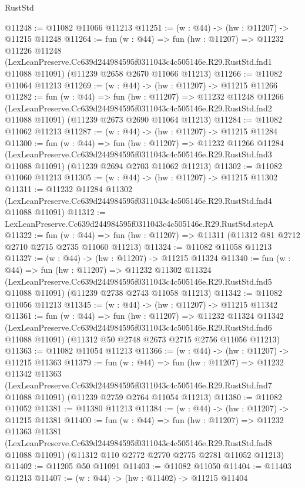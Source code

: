 \begin{lexlean}{RustStd}
\begin{coremodule}
@11248 := @11082 @11066 @11213
@11251 := (w : @44) -> (hw : @11207) -> @11215 @11248
@11264 := fun (w : @44) =>
  fun (hw : @11207) =>
  @11232
    @11226
    @11248
    (LexLeanPreserve.Cc639d244984595f0311043c4c505146e.R29.RustStd.fnd1 @11088 @11091)
    (@11239 @2658 @2670 @11066 @11213)
@11266 := @11082 @11064 @11213
@11269 := (w : @44) -> (hw : @11207) -> @11215 @11266
@11282 := fun (w : @44) =>
  fun (hw : @11207) =>
  @11232
    @11248
    @11266
    (LexLeanPreserve.Cc639d244984595f0311043c4c505146e.R29.RustStd.fnd2 @11088 @11091)
    (@11239 @2673 @2690 @11064 @11213)
@11284 := @11082 @11062 @11213
@11287 := (w : @44) -> (hw : @11207) -> @11215 @11284
@11300 := fun (w : @44) =>
  fun (hw : @11207) =>
  @11232
    @11266
    @11284
    (LexLeanPreserve.Cc639d244984595f0311043c4c505146e.R29.RustStd.fnd3 @11088 @11091)
    (@11239 @2694 @2703 @11062 @11213)
@11302 := @11082 @11060 @11213
@11305 := (w : @44) -> (hw : @11207) -> @11215 @11302
@11311 := @11232
    @11284
    @11302
    (LexLeanPreserve.Cc639d244984595f0311043c4c505146e.R29.RustStd.fnd4 @11088 @11091)
@11312 := LexLeanPreserve.Cc639d244984595f0311043c4c505146e.R29.RustStd.stepA
@11322 := fun (w : @44) =>
  fun (hw : @11207) => @11311 (@11312 @81 @2712 @2710 @2715 @2735 @11060 @11213)
@11324 := @11082 @11058 @11213
@11327 := (w : @44) -> (hw : @11207) -> @11215 @11324
@11340 := fun (w : @44) =>
  fun (hw : @11207) =>
  @11232
    @11302
    @11324
    (LexLeanPreserve.Cc639d244984595f0311043c4c505146e.R29.RustStd.fnd5 @11088 @11091)
    (@11239 @2738 @2743 @11058 @11213)
@11342 := @11082 @11056 @11213
@11345 := (w : @44) -> (hw : @11207) -> @11215 @11342
@11361 := fun (w : @44) =>
  fun (hw : @11207) =>
  @11232
    @11324
    @11342
    (LexLeanPreserve.Cc639d244984595f0311043c4c505146e.R29.RustStd.fnd6 @11088 @11091)
    (@11312 @50 @2748 @2673 @2715 @2756 @11056 @11213)
@11363 := @11082 @11054 @11213
@11366 := (w : @44) -> (hw : @11207) -> @11215 @11363
@11379 := fun (w : @44) =>
  fun (hw : @11207) =>
  @11232
    @11342
    @11363
    (LexLeanPreserve.Cc639d244984595f0311043c4c505146e.R29.RustStd.fnd7 @11088 @11091)
    (@11239 @2759 @2764 @11054 @11213)
@11380 := @11082 @11052
@11381 := @11380 @11213
@11384 := (w : @44) -> (hw : @11207) -> @11215 @11381
@11400 := fun (w : @44) =>
  fun (hw : @11207) =>
  @11232
    @11363
    @11381
    (LexLeanPreserve.Cc639d244984595f0311043c4c505146e.R29.RustStd.fnd8 @11088 @11091)
    (@11312 @110 @2772 @2770 @2775 @2781 @11052 @11213)
@11402 := @11205 @50 @11091
@11403 := @11082 @11050
@11404 := @11403 @11213
@11407 := (w : @44) -> (hw : @11402) -> @11215 @11404

\end{coremodule}
\end{lexlean}
